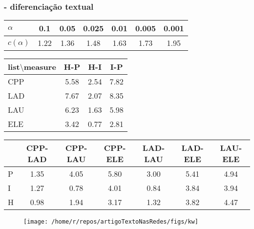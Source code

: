 \documentclass[10pt]{beamer}
\begin{document}
\begin{frame}
\frametitle{- diferenciação textual}

\begin{table}[H]
\centering
\tiny
\begin{tabular}{|l||c|c|c|c|c|c|}\hline
$\alpha$    & 0.1  & 0.05 & 0.025 & 0.01 & 0.005 & 0.001 \\\hline
$c(\alpha)$ & 1.22 & 1.36 & 1.48  & 1.63 & 1.73  & 1.95  \\\hline
\end{tabular}
\end{table}
\vfill
\begin{minipage}[t]{0.4\linewidth}
\begin{table}
    \tiny
\begin{center} 
\setlength{\tabcolsep}{.26667em}
  \begin{tabular}{|l|| c|c|c|}\hline
list$\setminus$measure & H-P & H-I & I-P \\\hline
CPP & 5.58 & 2.54 & 7.82 \\\hline
LAD & 7.67 & 2.07 & 8.35 \\\hline
LAU & 6.23 & 1.63 & 5.98 \\\hline
ELE & 3.42 & 0.77 & 2.81 \\\hline
  \end{tabular}
 \end{center}
\end{table}
\end{minipage}
\hspace{1cm}%
	\begin{minipage}[t]{0.4\linewidth}
\begin{table}[!h]
\tiny
\begin{center}
\setlength{\tabcolsep}{.06667em}
  \begin{tabular}{|l|| c|c|c|c|c|c|}\hline
& CPP-LAD & CPP-LAU & CPP-ELE & LAD-LAU & LAD-ELE & LAU-ELE \\\hline
P & 1.35 & 4.05 & 5.80 & 3.00 & 5.41 & 4.94 \\\hline
I & 1.27 & 0.78 & 4.01 & 0.84 & 3.84 & 3.94 \\\hline
H & 0.98 & 1.94 & 3.17 & 1.32 & 3.82 & 4.47 \\\hline
  \end{tabular}
\end{center}
\end{table}
\end{minipage}
\vfill
\begin{figure}[h!]
    \centering
    \texttt{[image: /home/r/repos/artigoTextoNasRedes/figs/kw]}
\end{figure}



\end{frame}
\end{document}
